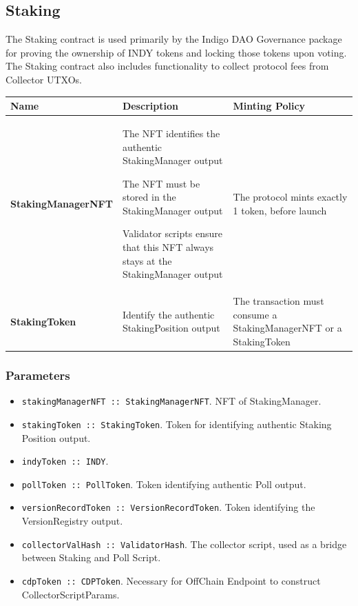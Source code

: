 \documentclass{article}
\begin{document}
\begin{sloppypar}
\hypertarget{staking-1}{%
\subsection{Staking}\label{staking-1}}

The Staking contract is used primarily by the Indigo DAO Governance
package for proving the ownership of INDY tokens and locking those
tokens upon voting. The Staking contract also includes functionality to
collect protocol fees from Collector UTXOs.

\begin{tabularx}{\linewidth}{l|L|L}
\caption{Staking native tokens}
\tabularnewline
\toprule
\textbf{Name} & \textbf{Description} & \textbf{Minting
Policy}
\tabularnewline
\midrule
\endhead
\textbf{StakingManagerNFT}
&
The NFT identifies the authentic StakingManager output

The NFT must be stored in the StakingManager output

Validator scripts ensure that this NFT always stays at the
StakingManager output
&
The protocol mints exactly 1 token, before launch
\tabularnewline
\midrule
\textbf{StakingToken} & Identify the authentic StakingPosition output &
The transaction must consume a StakingManagerNFT or a
StakingToken
\tabularnewline
\bottomrule
\end{tabularx}

\hypertarget{parameters}{%
\subsubsection{Parameters}\label{parameters}}

\begin{itemize}
\item
  \texttt{stakingManagerNFT~::~StakingManagerNFT}. NFT of
  StakingManager.
\item
  \texttt{stakingToken~::~StakingToken}. Token for identifying authentic
  Staking Position output.
\item
  \texttt{indyToken~::~INDY}.
\item
  \texttt{pollToken~::~PollToken}. Token identifying authentic Poll
  output.
\item
  \texttt{versionRecordToken~::~VersionRecordToken}. Token identifying
  the VersionRegistry output.
\item
  \texttt{collectorValHash~::~ValidatorHash}. The collector script, used
  as a bridge between Staking and Poll Script.
\item
  \texttt{cdpToken~::~CDPToken}. Necessary for OffChain Endpoint to
  construct CollectorScriptParams.
\end{itemize}


\end{sloppypar}
\end{document}
